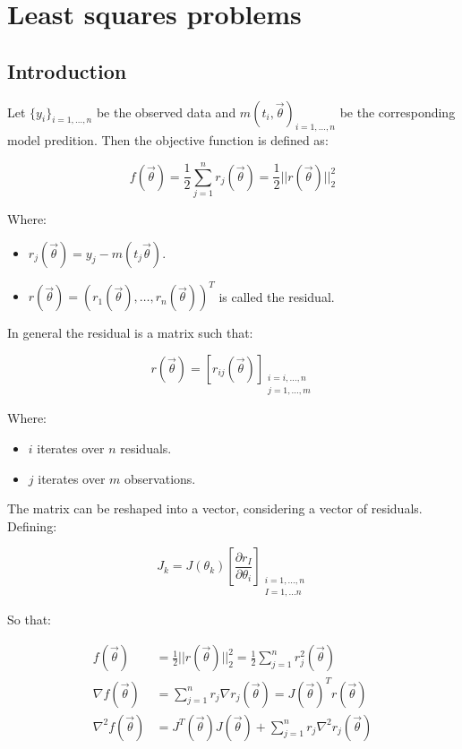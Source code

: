 \graphicspath{{chapters/10/images/}}
\chapter{Least squares problems}

\section{Introduction}
Let $\{y_i\}_{i = 1, \dots, n}$ be the observed data and $m(t_i, \vec{\theta})_{i = 1, \dots, n}$ be the corresponding model predition.
Then the objective function is defined as:

$$f(\vec{\theta}) = \frac{1}{2}\sum\limits_{j = 1}^nr_j(\vec{\theta}) = \frac{1}{2}||r(\vec{\theta})||_2^2$$

Where:

\begin{multicols}{2}
  \begin{itemize}
    \item $r_j(\vec{\theta}) = y_j-m(t_j \vec{\theta})$.
    \item $r(\vec{\theta}) = (r_1(\vec{\theta}), \dots, r_n(\vec{\theta}))^T$ is called the residual.
  \end{itemize}
\end{multicols}

In general the residual is a matrix such that:

$$r(\vec{\theta}) = [r_{ij}(\vec{\theta})]_{\substack{i = i, \dots, n\\j = 1, \dots, m}}$$

Where:

\begin{multicols}{2}
  \begin{itemize}
    \item $i$ iterates over $n$ residuals.
    \item $j$ iterates over $m$ observations.
  \end{itemize}
\end{multicols}

The matrix can be reshaped into a vector, considering a vector of residuals.
Defining:

$$J_k=J(\theta_k)\left[\frac{\partial r_I}{\partial\theta_i}\right]_{\substack{i=1, ...,n\\ I=1,...n}}$$

So that:

\begin{align*}
  f(\vec{\theta}) &= \frac{1}{2}||r(\vec{\theta})||_2^2 = \frac{1}{2}\sum\limits_{j=1}^nr_j^2(\vec{\theta})\\
  \nabla f(\vec{\theta}) &= \sum\limits_{j=1}^nr_j\nabla r_j(\vec{\theta}) = J(\vec{\theta})^Tr(\vec{\theta})\\
  \nabla^2 f(\vec{\theta}) &= J^T(\vec{\theta})J(\vec{\theta}) + \sum\limits_{j=1}^nr_j\nabla^2 r_j(\vec{\theta})
\end{align*}

